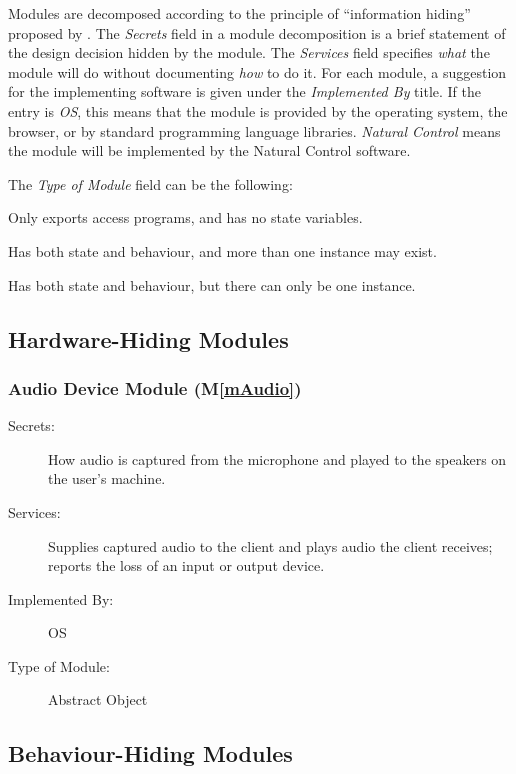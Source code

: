 \documentclass[12pt, titlepage]{article}
\newcommand{\progname}{Natural Control}
\newcommand{\mref}[1]{M\ref{#1}}
\begin{document}
Modules are decomposed according to the principle of ``information hiding''
proposed by \citet{ParnasEtAl1984}. The \emph{Secrets} field in a module
decomposition is a brief statement of the design decision hidden by the module.
The \emph{Services} field specifies \emph{what} the module will do without
documenting \emph{how} to do it. For each module, a suggestion for the
implementing software is given under the \emph{Implemented By} title. If the
entry is \emph{OS}, this means that the module is provided by the operating
system, the browser, or by standard programming language libraries.
\emph{\progname{}} means the module will be implemented by the \progname{}
software.

\noindent The \emph{Type of Module} field can be the following:
\begin{description}[leftmargin=0.8cm]
  \item[Library:] Only exports access programs, and has no state variables.
  \item[Abstract Data Type:] Has both state and behaviour, and more than one
    instance may exist.
  \item[Abstract Object:] Has both state and behaviour, but there can only be
    one instance.
\end{description}

\subsection{Hardware-Hiding Modules}

\subsubsection{Audio Device Module (\mref{mAudio})}
\begin{description}
\item[Secrets:] How audio is captured from the microphone and played to the
speakers on the user's machine.
\item[Services:] Supplies captured audio to the client and plays audio the
client receives; reports the loss of an input or output device.
\item[Implemented By:] OS
\item[Type of Module:] Abstract Object
\end{description}

\subsection{Behaviour-Hiding Modules}
\end{document}
